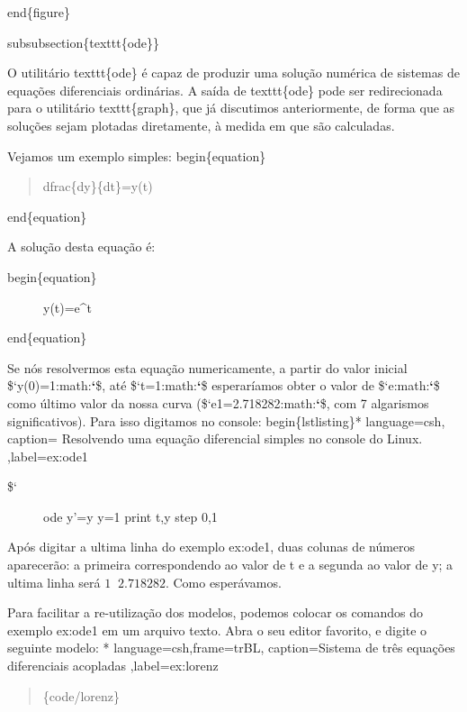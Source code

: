 \documentclass[a4paper,10pt,brazil]{sphinxmanual}
\begin{document}
end\{figure\}

subsubsection\{texttt\{ode\}\}

O utilitário texttt\{ode\} é capaz de produzir uma solução numérica de sistemas de equações diferenciais ordinárias. A saída de texttt\{ode\} pode ser redirecionada para o utilitário texttt\{graph\}, que já discutimos anteriormente, de forma que as soluções sejam plotadas diretamente, à medida em que são calculadas.

Vejamos um exemplo simples:
begin\{equation\}
\begin{quote}

dfrac\{dy\}\{dt\}=y(t)
\end{quote}

end\{equation\}

A solução desta equação é:
\begin{description}
\item[{begin\{equation\}}] \leavevmode
y(t)=e\textasciicircum{}t

\end{description}

end\{equation\}

Se nós resolvermos esta equação numericamente, a partir do valor inicial \${}`y(0)=1:math:{\color{red}\bfseries{}{}`}\$, até \${}`t=1:math:{\color{red}\bfseries{}{}`}\$ esperaríamos obter o valor de \${}`e:math:{\color{red}\bfseries{}{}`}\$ como último valor da nossa curva (\${}`e1=2.718282:math:{\color{red}\bfseries{}{}`}\$, com 7 algarismos significativos). Para isso digitamos no console:
begin\{lstlisting\}* language=csh, caption= Resolvendo uma equação diferencial simples no console do Linux. ,label=ex:ode1
\begin{description}
\item[{\${}`}] \leavevmode
ode y'=y y=1 print t,y step 0,1

\end{description}

Após digitar a ultima linha do exemplo ex:ode1, duas colunas de
números aparecerão: a primeira correspondendo ao valor de t e a
segunda ao valor de y; a ultima linha será $1\;\;2.718282$.
Como esperávamos.

Para facilitar a re-utilização dos modelos, podemos colocar os
comandos do exemplo ex:ode1 em um arquivo texto. Abra o seu editor
favorito, e digite o seguinte modelo:
* language=csh,frame=trBL, caption=Sistema de três equações diferenciais acopladas ,label=ex:lorenz
\begin{quote}

\{code/lorenz\}
\end{quote}
\end{document}
